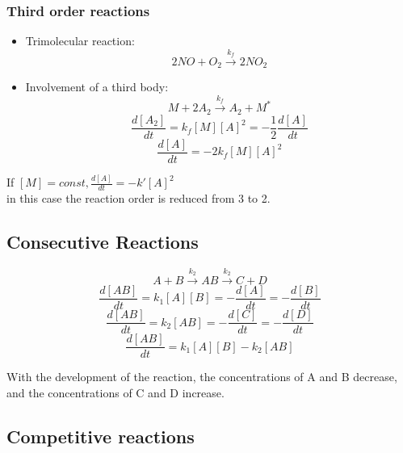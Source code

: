\documentclass[12pt]{article}
\begin{document}
\subsubsection{Third order reactions}
\begin{itemize}
    \item Trimolecular reaction:
    \begin{equation}
    2NO+O_{2}\xrightarrow{k_{f}} 2NO_{2}
    \end{equation}
    \item Involvement of a third body:
    \begin{equation}
    M+2A_{2}\xrightarrow{k_{f}} A_{2}+M^{*}
    \end{equation}
    \begin{equation}
        \frac{d[A_{2}]}{dt}=k_{f}[M][A]^{2}=-\frac{1}{2}\frac{d[A]}{dt}
    \end{equation}
    \begin{equation}
        \frac{d[A]}{dt}=-2k_{f}[M][A]^{2}
    \end{equation}
\end{itemize}
If $[M]=const,  \frac{d[A]}{dt}=-k'[A]^{2}$\\ in this case the reaction order is reduced from 3 to 2.

\subsection{Consecutive Reactions}

\begin{equation}
    A+B\xrightarrow{k_{2}}AB\xrightarrow{k_{2}}C+D
\end{equation}
\begin{equation}
        \frac{d[AB]}{dt}=k_{1}[A][B]=-\frac{d[A]}{dt}=-\frac{d[B]}{dt}
\end{equation}
\begin{equation}
        \frac{d[AB]}{dt}=k_{2}[AB]=-\frac{d[C]}{dt}=-\frac{d[D]}{dt}
\end{equation}
\begin{equation}
        \frac{d[AB]}{dt}=k_{1}[A][B]-k_{2}[AB]
\end{equation}

With the development of the reaction, the concentrations of A and B decrease, and the concentrations of C and D increase.

\subsection{Competitive reactions}
\end{document}
